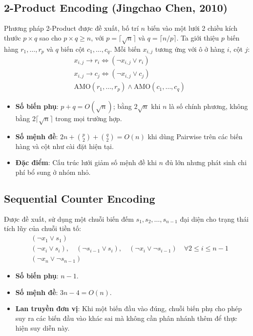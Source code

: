 \documentclass[a4paper,fleqn,nologo]{cas-sc}
\begin{document}
\subsection{2-Product Encoding (Jingchao Chen, 2010)}
Phương pháp 2-Product được \cite{chen2010new} đề xuất, bố trí $n$ biến vào một lưới 2 chiều kích thước $p \times q$ sao cho $p \times q \ge n$, với $p = \lceil \sqrt{n} \rceil$ và $q = \lceil n / p \rceil$. 
Ta giới thiệu $p$ biến hàng $r_1, \dots, r_p$ và $q$ biến cột $c_1, \dots, c_q$. Mỗi biến $x_{i,j}$ tương ứng với ô ở hàng $i$, cột $j$:
\begin{align}
&x_{i,j} \to r_i \iff (\neg x_{i,j} \lor r_i) \\
&x_{i,j} \to c_j \iff (\neg x_{i,j} \lor c_j) \\
&\text{AMO}(r_1, \dots, r_p) \land \text{AMO}(c_1, \dots, c_q)
\end{align}
\begin{itemize}
    \item \textbf{Số biến phụ}: $p+q=O(\sqrt n)$; bằng $2\sqrt n$ khi $n$ là số chính phương, không bằng $2\lceil\sqrt n\rceil$ trong mọi trường hợp.
    \item \textbf{Số mệnh đề}: $2n+\binom p2+\binom q2=O(n)$ khi dùng Pairwise trên các biến hàng và cột như cài đặt hiện tại.
    \item \textbf{Đặc điểm}: Cấu trúc lưới giảm số mệnh đề khi $n$ đủ lớn nhưng phát sinh chi phí bổ sung ở nhóm nhỏ.
\end{itemize}

\subsection{Sequential Counter Encoding}
Được \cite{sinz2005towards} đề xuất, sử dụng một chuỗi biến đếm $s_1, s_2, \dots, s_{n-1}$ đại diện cho trạng thái tích lũy của chuỗi tiền tố:
\begin{align}
&(\neg x_1 \lor s_1) \\
&(\neg x_i \lor s_i), \quad (\neg s_{i-1} \lor s_i), \quad (\neg x_i \lor \neg s_{i-1}) \quad \forall 2 \le i \le n-1 \\
&(\neg x_n \lor \neg s_{n-1})
\end{align}
\begin{itemize}
    \item \textbf{Số biến phụ}: $n - 1$.
    \item \textbf{Số mệnh đề}: $3n - 4 = O(n)$.
    \item \textbf{Lan truyền đơn vị}: Khi một biến đầu vào đúng, chuỗi biến phụ cho phép suy ra các biến đầu vào khác sai mà không cần phân nhánh thêm để thực hiện suy diễn này.
\end{itemize}
\end{document}
